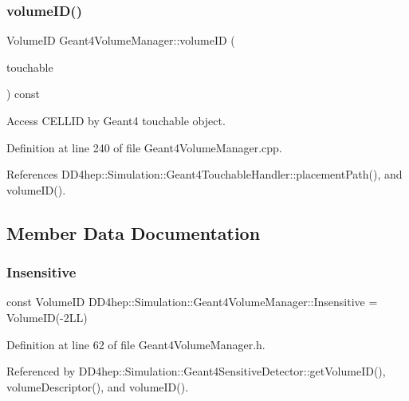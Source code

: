\subsubsection{\texorpdfstring{volume\+I\+D()}{volumeID()}\hspace{0.1cm}{\footnotesize\ttfamily [2/2]}}
{\footnotesize\ttfamily Volume\+ID Geant4\+Volume\+Manager\+::volume\+ID (\begin{DoxyParamCaption}\item[{const G4\+V\+Touchable $\ast$}]{touchable }\end{DoxyParamCaption}) const}



Access C\+E\+L\+L\+ID by Geant4 touchable object. 



Definition at line 240 of file Geant4\+Volume\+Manager.\+cpp.



References D\+D4hep\+::\+Simulation\+::\+Geant4\+Touchable\+Handler\+::placement\+Path(), and volume\+I\+D().



\subsection{Member Data Documentation}
\hypertarget{class_d_d4hep_1_1_simulation_1_1_geant4_volume_manager_a3cd1e1946cee2db0e8a5a8240c9095be}{}\label{class_d_d4hep_1_1_simulation_1_1_geant4_volume_manager_a3cd1e1946cee2db0e8a5a8240c9095be} 
\subsubsection{\texorpdfstring{Insensitive}{Insensitive}}
{\footnotesize\ttfamily const Volume\+ID D\+D4hep\+::\+Simulation\+::\+Geant4\+Volume\+Manager\+::\+Insensitive = Volume\+ID(-\/2\+L\+L)\hspace{0.3cm}{\ttfamily [static]}}



Definition at line 62 of file Geant4\+Volume\+Manager.\+h.



Referenced by D\+D4hep\+::\+Simulation\+::\+Geant4\+Sensitive\+Detector\+::get\+Volume\+I\+D(), volume\+Descriptor(), and volume\+I\+D().

